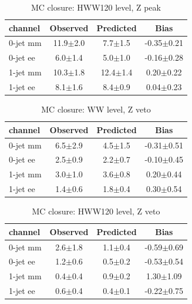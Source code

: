 \begin{table}[!hbtp]
{
 \begin{center}
 \begin{tabular}{l | c c c}
 \hline
channel       & Observed & Predicted & Bias \\
 \hline
0-jet  mm &   11.9$\pm$2.0      &    7.7$\pm$1.5      &  -0.35$\pm$0.21  \\
0-jet  ee &    6.0$\pm$1.4      &    5.0$\pm$1.0      &  -0.16$\pm$0.28  \\
 \hline
1-jet  mm &   10.3$\pm$1.8      &   12.4$\pm$1.4      &   0.20$\pm$0.22  \\
1-jet  ee &    8.1$\pm$1.6      &    8.4$\pm$0.9      &   0.04$\pm$0.23  \\
 \hline
\end{tabular}
\end{center}
}
\caption{MC closure: HWW120 level, Z peak}
\label{tab:zeta:mccloseHWWzp}
\end{table}

\begin{table}[!hbtp]
{
 \begin{center}
 \begin{tabular}{l | c c c}
 \hline
channel       & Observed & Predicted & Bias \\
 \hline
0-jet  mm &    6.5$\pm$2.9      &    4.5$\pm$1.5      &  -0.31$\pm$0.51  \\
0-jet  ee &    2.5$\pm$0.9      &    2.2$\pm$0.7      &  -0.10$\pm$0.45  \\
 \hline
1-jet  mm &    3.0$\pm$1.0      &    3.6$\pm$0.8      &   0.20$\pm$0.44  \\
1-jet  ee &    1.4$\pm$0.6      &    1.8$\pm$0.4      &   0.30$\pm$0.54  \\
 \hline
\end{tabular}
\end{center}
}
\caption{MC closure: WW level, Z veto}
\label{tab:zeta:mccloseWWzv}
\end{table}

\begin{table}[!hbtp]
{
 \begin{center}
 \begin{tabular}{l | c c c}
 \hline
channel       & Observed & Predicted & Bias \\
 \hline
0-jet  mm &    2.6$\pm$1.8      &    1.1$\pm$0.4      &  -0.59$\pm$0.69  \\
0-jet  ee &    1.2$\pm$0.6      &    0.5$\pm$0.2      &  -0.53$\pm$0.54  \\
 \hline
1-jet  mm &    0.4$\pm$0.4      &    0.9$\pm$0.2      &   1.30$\pm$1.09  \\
1-jet  ee &    0.6$\pm$0.4      &    0.4$\pm$0.1      &  -0.22$\pm$0.75  \\
 \hline
\end{tabular}
\end{center}
}
\caption{MC closure: HWW120 level, Z veto}
\label{tab:zeta:mccloseHWWzv}
\end{table}

